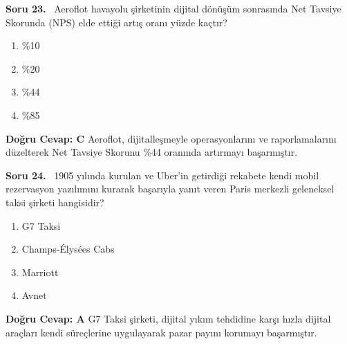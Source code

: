 \documentclass[11pt,a4paper,openany]{book}
\begin{document}
\needspace{5cm}
\vspace{8pt}
\noindent\textbf{\large\sffamily Soru 23.} \ Aeroflot havayolu şirketinin dijital dönüşüm sonrasında Net Tavsiye Skorunda (NPS) elde ettiği artış oranı yüzde kaçtır?
\begin{enumerate}[label=\Alph*), leftmargin=25pt, topsep=4pt, itemsep=2pt]
    \item \%10
    \item \%20
    \item \%44
    \item \%85
\end{enumerate}
\vspace{4pt}
\begin{tcolorbox}[title=Cevap ve Açıklama, colback=gray!3!white, colframe=primarycolor!90!black, arc=2mm, fonttitle=\bfseries\sffamily, top=6pt, bottom=6pt]
    \textbf{Doğru Cevap: C}
    \vspace{2pt}
    Aeroflot, dijitalleşmeyle operasyonlarını ve raporlamalarını düzelterek Net Tavsiye Skorunu \%44 oranında artırmayı başarmıştır.
\end{tcolorbox}
\vspace{10pt}

\needspace{5cm}
\vspace{8pt}
\noindent\textbf{\large\sffamily Soru 24.} \ 1905 yılında kurulan ve Uber'in getirdiği rekabete kendi mobil rezervasyon yazılımını kurarak başarıyla yanıt veren Paris merkezli geleneksel taksi şirketi hangisidir?
\begin{enumerate}[label=\Alph*), leftmargin=25pt, topsep=4pt, itemsep=2pt]
    \item G7 Taksi
    \item Champs-Élysées Cabs
    \item Marriott
    \item Avnet
\end{enumerate}
\vspace{4pt}
\begin{tcolorbox}[title=Cevap ve Açıklama, colback=gray!3!white, colframe=primarycolor!90!black, arc=2mm, fonttitle=\bfseries\sffamily, top=6pt, bottom=6pt]
    \textbf{Doğru Cevap: A}
    \vspace{2pt}
    G7 Taksi şirketi, dijital yıkım tehdidine karşı hızla dijital araçları kendi süreçlerine uygulayarak pazar payını korumayı başarmıştır.
\end{tcolorbox}
\vspace{10pt}
\end{document}
